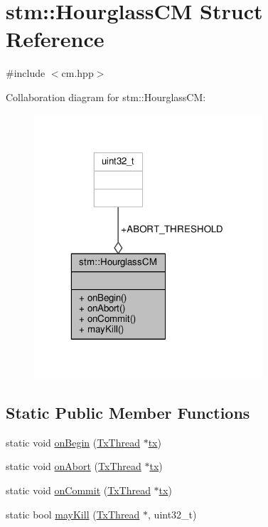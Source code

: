 \hypertarget{structstm_1_1HourglassCM}{\section{stm\-:\-:Hourglass\-C\-M Struct Reference}
\label{structstm_1_1HourglassCM}
}


{\ttfamily \#include $<$cm.\-hpp$>$}



Collaboration diagram for stm\-:\-:Hourglass\-C\-M\-:
\nopagebreak
\begin{figure}[H]
\begin{center}
\leavevmode
\includegraphics[width=241pt]{structstm_1_1HourglassCM__coll__graph}
\end{center}
\end{figure}
\subsection*{Static Public Member Functions}
\begin{DoxyCompactItemize}
\item 
static void \hyperlink{structstm_1_1HourglassCM_a0e93052d8f3cffebfc3cf74c7fd155ae}{on\-Begin} (\hyperlink{structstm_1_1TxThread}{Tx\-Thread} $\ast$\hyperlink{stmskip_8cc_a0f1c58699b83ce5a08bd9ee859250d72}{tx})
\item 
static void \hyperlink{structstm_1_1HourglassCM_a313b22ffc9afaa3602f94dd7965f04ac}{on\-Abort} (\hyperlink{structstm_1_1TxThread}{Tx\-Thread} $\ast$\hyperlink{stmskip_8cc_a0f1c58699b83ce5a08bd9ee859250d72}{tx})
\item 
static void \hyperlink{structstm_1_1HourglassCM_a59dc57fa05c484b45bd4fb1772d9f425}{on\-Commit} (\hyperlink{structstm_1_1TxThread}{Tx\-Thread} $\ast$\hyperlink{stmskip_8cc_a0f1c58699b83ce5a08bd9ee859250d72}{tx})
\item 
static bool \hyperlink{structstm_1_1HourglassCM_a6677b8b75089f65e5d6bfeeec006a979}{may\-Kill} (\hyperlink{structstm_1_1TxThread}{Tx\-Thread} $\ast$, uint32\-\_\-t)
\end{DoxyCompactItemize}
